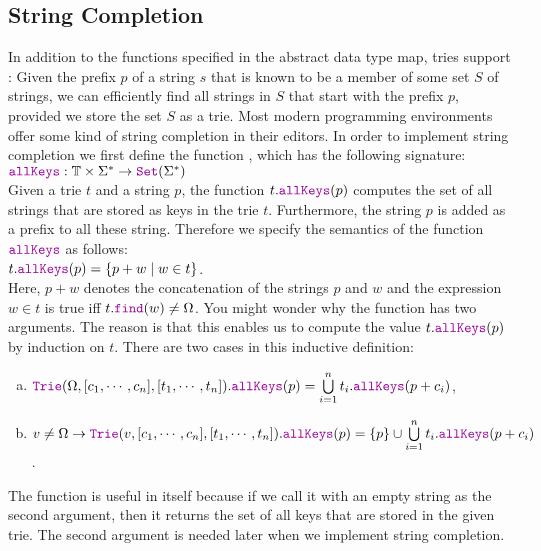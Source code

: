 \subsection{String Completion}
In addition to the functions specified in the abstract data type map, tries support
:  Given the prefix $p$ of a string $s$ that is known to be a
member of some set $S$ of strings, we can efficiently find all strings in $S$ that start with the prefix $p$, provided we
store the set $S$ as a trie.  Most modern programming environments offer some kind of string completion in
their editors.  In order to implement string completion we first define the function , which
has the following signature:
\\[0.2cm]
\hspace*{1.3cm}
$\mytt{allKeys}: \mathbb{T} \times \Sigma^* \rightarrow \mytt{Set}(\Sigma^*)$
\\[0.2cm]
Given a trie $t$ and a string $p$, the function $t.\mytt{allKeys}(p)$ computes the set of all strings that
are stored as keys in the trie $t$.  Furthermore, the string $p$ is added as a prefix to all these string.
Therefore we specify the semantics of the function $\mytt{allKeys}$ as follows:
\\[0.2cm]
\hspace*{1.3cm}
$t.\mytt{allKeys}(p) = \{ p+w \mid w \in t \}$.
\\[0.2cm]
Here, $p+w$ denotes the concatenation of the strings $p$ and $w$ and the expression $w \in t$ is true iff
$t.\mytt{find}(w) \not= \Omega$.  You might wonder why the function  has two arguments.  The
reason is that this enables us to compute the value $t.\mytt{allKeys}(p)$ by induction on $t$.  There are two
cases in this inductive definition:  
\begin{enumerate}[(a)]
\item $\mytt{Trie}(\Omega, [c_1, \cdots, c_n], [t_1,\cdots,t_n]).\mytt{allKeys}(p) = 
       \bigcup\limits_{i=1}^n t_i.\mytt{allKeys}(p+c_i) 
      $,
\item $v \not= \Omega \rightarrow 
       \mytt{Trie}(v, [c_1, \cdots, c_n], [t_1,\cdots,t_n]).\mytt{allKeys}(p) = 
       \{p\} \cup \bigcup\limits_{i=1}^n t_i.\mytt{allKeys}(p+c_i) 
      $.
\end{enumerate}
The function  is useful in itself because if we call it with an empty string as the second
argument, then it returns the set of all keys that are stored in the given trie.  The second argument is needed
later when we implement string completion. 

